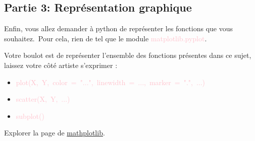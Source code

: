 \documentclass[11pt, french]{article}
\newcommand{\inlsnippet}[1]{\colorbox{gray!10}{\mbox{\textcolor{pink}{#1}}}}
\begin{document}
\subsection*{Partie 3: Représentation graphique}

Enfin, vous allez demander à python de représenter les fonctions que vous souhaitez.\
Pour cela, rien de tel que le module \inlsnippet{matplotlib.pyplot}.

Votre boulot est de représenter l'ensemble des fonctions présentes dans ce sujet, laissez votre côté artiste s'exprimer :
\begin{itemize}

    \item \inlsnippet{plot(X, Y, color = "...", linewidth = ..., marker = ".", ...)}
    \item \inlsnippet{scatter(X, Y, ...)}
    \item \inlsnippet{subplot()}
\end{itemize}

Explorer la page de \href{https://matplotlib.org/3.1.1/gallery/index.html}{mathplotlib}.

\end{document}
